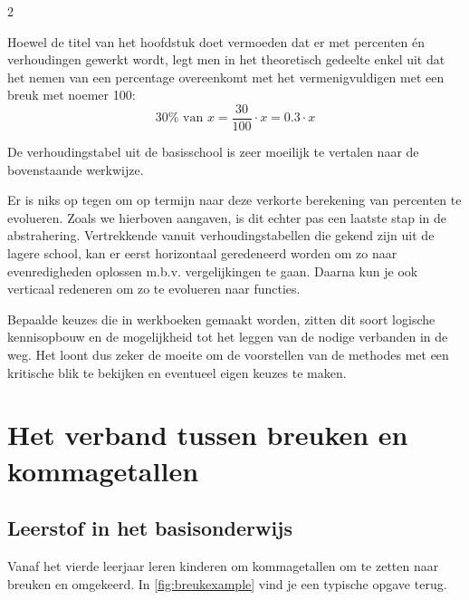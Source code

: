 \begin{multicols}{2}

Hoewel de titel van het hoofdstuk doet vermoeden dat er met percenten én verhoudingen gewerkt wordt, legt men in het theoretisch gedeelte enkel uit dat het nemen van een percentage overeenkomt met het vermenigvuldigen met een breuk met noemer 100:
\[
30 \% \text{ van } x = \frac{30}{100} \cdot x = \num{0.3} \cdot x
\]

De verhoudingstabel uit de basisschool is zeer moeilijk te vertalen naar de bovenstaande werkwijze.

Er is niks op tegen om op termijn naar deze verkorte berekening van percenten te evolueren.
Zoals we hierboven aangaven, is dit echter pas een laatste stap in de abstrahering.
Vertrekkende vanuit verhoudingstabellen die gekend zijn uit de lagere school, kan er eerst horizontaal geredeneerd worden om zo naar evenredigheden oplossen m.b.v. vergelijkingen te gaan.
Daarna kun je ook verticaal redeneren om zo te evolueren naar functies.

Bepaalde keuzes die in werkboeken gemaakt worden, zitten dit soort logische kennisopbouw en de mogelijkheid tot het leggen van de nodige verbanden in de weg.
Het loont dus zeker de moeite om de voorstellen van de methodes met een kritische blik te bekijken en eventueel eigen keuzes te maken.

\section{Het verband tussen breuken en kommagetallen}\label{breuk}

\subsection{Leerstof in het basisonderwijs}
Vanaf het vierde leerjaar leren kinderen om kommagetallen om te zetten naar breuken en omgekeerd.
In \autoref{fig:breukexample} vind je een typische opgave terug.

\end{multicols}


